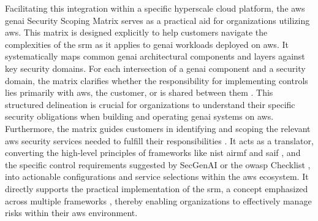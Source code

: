 Facilitating this integration within a specific \gls{hyperscale} cloud platform, the \gls{aws} \gls{genai} Security Scoping Matrix serves as a practical aid for organizations utilizing \gls{aws}\cite{noauthor_securing_nodate}. This matrix is designed explicitly to help customers navigate the complexities of the \gls{srm} as it applies to \gls{genai} workloads deployed on \gls{aws}. It systematically maps common \gls{genai} architectural components and layers against key security domains\cite{noauthor_securing_nodate}. For each intersection of a \gls{genai} component and a security domain, the matrix clarifies whether the responsibility for implementing controls lies primarily with \gls{aws}, the customer, or is shared between them \cite{noauthor_securing_nodate}. This structured delineation is crucial for organizations to understand their specific security obligations when building and operating \gls{genai} systems on \gls{aws}. Furthermore, the matrix guides customers in identifying and scoping the relevant \gls{aws} security services needed to fulfill their responsibilities \cite{noauthor_securing_nodate}. It acts as a translator, converting the high-level principles of frameworks like \gls{nist} \gls{airmf} \cite{tabassi_artificial_2023} and \gls{saif} \cite{hansen_introducing_2023}, and the specific control requirements suggested by SecGenAI \cite{haryanto_secgenai_2024} or the \gls{owasp} Checklist \cite{editor_llm_nodate}, into actionable configurations and service selections within the \gls{aws} ecosystem. It directly supports the practical implementation of the \gls{srm}, a concept emphasized across multiple frameworks \cite{tabassi_artificial_2023, hansen_introducing_2023, haryanto_secgenai_2024, editor_llm_nodate}, thereby enabling organizations to effectively manage risks within their \gls{aws} environment.
